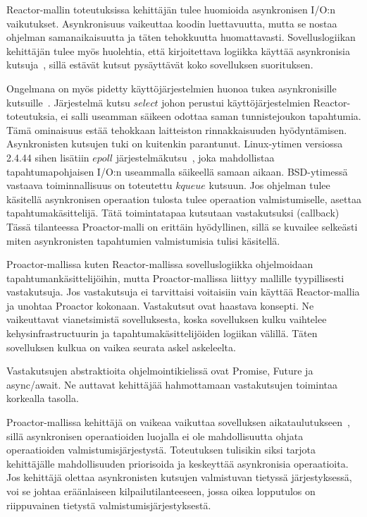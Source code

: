 \documentclass[finnish]{tktltiki2}
\theoremstyle{definition}
\theoremstyle{remark}
\begin{document}
Reactor-mallin toteutuksissa kehittäjän tulee huomioida
asynkronisen I/O:n vaikutukset. Asynkronisuus vaikeuttaa koodin
luettavuutta, mutta se nostaa ohjelman samanaikaisuutta ja täten
tehokkuutta huomattavasti. Sovelluslogiikan kehittäjän
tulee myös huolehtia, että kirjoitettava logiikka
käyttää asynkronisia kutsuja~\cite{pyarali_proactor_1997}, sillä estävät
kutsut pysäyttävät koko sovelluksen suorituksen.

Ongelmana on myös pidetty käyttöjärjestelmien huonoa
tukea asynkronisille kutsuille~\cite{pyarali_proactor_1997}. Järjestelmä kutsu
$select$ johon perustui käyttöjärjestelmien Reactor-toteutuksia,
ei salli useamman säikeen odottaa saman tunnistejoukon tapahtumia.
Tämä ominaisuus estää tehokkaan laitteiston rinnakkaisuuden hyödyntämisen.
Asynkronisten kutsujen tuki on kuitenkin parantunut.
Linux-ytimen versiossa
2.4.44 sihen lisätiin $epoll$ järjestelmäkutsu~\cite{man_epoll}, joka
mahdollistaa tapahtumapohjaisen I/O:n useammalla säikeellä
samaan aikaan. BSD-ytimessä vastaava toiminnallisuus on toteutettu $kqueue$
kutsuun.
Jos ohjelman tulee käsitellä
asynkronisen operaation tulosta tulee operaation valmistumiselle,
asettaa tapahtumakäsittelijä. Tätä toimintatapaa kutsutaan vastakutsuksi (callback)
Tässä tilanteessa Proactor-malli on erittäin hyödyllinen, sillä se
kuvailee selkeästi miten asynkronisten tapahtumien valmistumisia tulisi käsitellä.

Proactor-mallissa kuten Reactor-mallissa sovelluslogiikka ohjelmoidaan 
tapahtumankäsittelijöihin, mutta Proactor-mallissa liittyy 
mallille tyypillisesti vastakutsuja. Jos vastakutsuja ei tarvittaisi
voitaisiin vain käyttää Reactor-mallia ja unohtaa Proactor kokonaan.
Vastakutsut ovat haastava konsepti. Ne vaikeuttavat vianetsimistä
sovelluksesta, koska sovelluksen kulku vaihtelee kehysinfrastructuurin
ja tapahtumakäsittelijöiden logiikan välillä. Täten sovelluksen 
kulkua on vaikea seurata askel askeleelta.

Vastakutsujen abstraktioita ohjelmointikielissä ovat Promise, Future ja
async/await. Ne auttavat kehittäjää hahmottamaan vastakutsujen 
toimintaa korkealla tasolla.

Proactor-mallissa kehittäjä on vaikeaa vaikuttaa sovelluksen
aikataulutukseen~\cite{pyarali_proactor_1997},
sillä asynkronisen operaatioiden luojalla
ei ole mahdollisuutta ohjata operaatioiden valmistumisjärjestystä.
Toteutuksen tulisikin siksi tarjota kehittäjälle mahdollisuuden
priorisoida ja keskeyttää asynkronisia operaatioita.
Jos kehittäjä olettaa asynkronisten kutsujen valmistuvan tietyssä järjestyksessä,
voi se johtaa eräänlaiseen kilpailutilanteeseen, jossa
oikea lopputulos on riippuvainen tietystä valmistumisjärjestyksestä.
\end{document}
